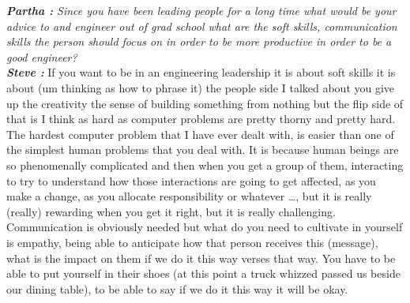 \documentclass[a4paper, 12pt]{article}
\begin{document}
\begin{flushleft}
        \textit {\textbf {Partha :} Since you have been leading people for a long time what would be your advice to and engineer out of grad school what are the soft skills, communication skills the person should focus on in order to be more productive in order to be a good engineer?}\\
        \textit {\textbf {Steve :}} If you want to be in an engineering leadership it is about soft skills it is about (um thinking as how to phrase it) the people side I talked about you give up the creativity the sense of building something from nothing but the flip side of that is I think as hard as computer problems are pretty thorny and pretty hard. The hardest computer problem that I have ever dealt with, is easier than one of the simplest human problems that you deal with. It is because human beings are so phenomenally complicated and then when you get a group of them, interacting to try to understand how those interactions are going to get affected, as you make a change, as you allocate responsibility or whatever \ldots, but it is really (really) rewarding when you get it right, but it is really challenging. Communication is obviously needed but what do you need to cultivate in yourself is empathy, being able to anticipate how that person receives this (message), what is the impact on them if we do it this way verses that way. You have to be able to put yourself in their shoes (at this point a truck whizzed passed us beside our dining table), to be able to say if we do it this way it will be okay. \\~\\


\end{flushleft}
\end{document}
